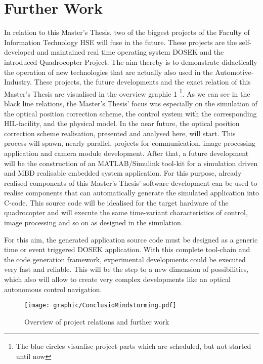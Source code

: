 \section{Further Work}

In relation to this Master's Thesis, two of the biggest projects of the Faculty of Information Technology \gls{HSE} will fuse in the future. These projects are the self-developed and maintained real time operating system \gls{DOSEK} and the introduced Quadrocopter Project. The aim thereby is to demonstrate didactically the operation of new technologies that are actually also used in the Automotive-Industry. These projects, the future developments and the exact relation of this Master's Thesis are visualised in the overview graphic 
\ref{fig:ConclusioMindstorming.pdf} \footnote{The blue circles visualise project parts which are scheduled, but not started until now}. As we can see in the black line relations, the Master's Thesis' focus was especially on the simulation of the optical position correction scheme, the control system with the corresponding \gls{HIL}-facility, and the physical model. In the near future, the optical position correction scheme realisation, presented and analysed here, will start. This process will spawn, nearly parallel, projects for communication, image processing application and camera module development.
After that, a future development will be the construction of an MATLAB/Simulink tool-kit for a simulation driven and \gls{MBD} realisable embedded system application. 
\newpage
For this purpose, already realised components of this Master's Thesis' software development can be used to realise components that can automatically generate the simulated application into C-code. This source code will be idealised for the target hardware of the quadrocopter and will execute the same time-variant characteristics of control,  image processing and so on as designed in the simulation.

For this aim, the generated application source code must be designed as a generic time or event triggered \gls{DOSEK} application. With this complete tool-chain and the code generation framework, experimental developments could be executed very fast and reliable. This will be the step to a new dimension of possibilities, which also will allow to create very complex developments like an optical autonomous control navigation. 

\begin{figure}[H]
	\centering
		\texttt{[image: graphic/ConclusioMindstorming.pdf]}
	\caption{Overview of project relations and further work}
	\label{fig:ConclusioMindstorming.pdf}
\end{figure}
